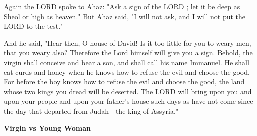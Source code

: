 \documentclass[11pt]{article}
\begin{document}
\newpage

\begin{biblicaloutline}[Isaiah 7:10-17]

    
    \begin{versesection}{2em}
         Again the LORD spoke to Ahaz:  "Ask a sign of the LORD ; let it be deep as Sheol or high as heaven."  But Ahaz said, "I will not ask, and I will not put the LORD to the test."
    \end{versesection}
    
    
    \begin{versesection}{2em}
         And he said, "Hear then, O house of David! Is it too little for you to weary men, that you weary  also?  Therefore the Lord himself will give you a sign. Behold, the virgin shall conceive and bear a son, and shall call his name Immanuel.  He shall eat curds and honey when he knows how to refuse the evil and choose the good.  For before the boy knows how to refuse the evil and choose the good, the land whose two kings you dread will be deserted.  The LORD will bring upon you and upon your people and upon your father's house such days as have not come since the day that  departed from Judah—the king of Assyria."
    \end{versesection}

\end{biblicaloutline}

\vspace{3em}
{\large\bfseries Virgin vs Young Woman}
\vspace{1em}

\end{document}
